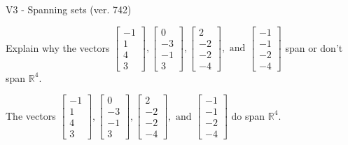 \begin{exercise}
  \begin{exerciseTitle}V3 - Spanning sets (ver. 742)\end{exerciseTitle}
  \begin{exerciseStatement}
    Explain why the vectors \(\left[\begin{array}{r}
-1 \\
1 \\
4 \\
3
\end{array}\right] , \left[\begin{array}{r}
0 \\
-3 \\
-1 \\
3
\end{array}\right] , \left[\begin{array}{r}
2 \\
-2 \\
-2 \\
-4
\end{array}\right] , \text{ and } \left[\begin{array}{r}
-1 \\
-1 \\
-2 \\
-4
\end{array}\right]\) span or don't span \(\mathbb{R}^4\). 
	


  \end{exerciseStatement}
  \begin{exerciseAnswer}
   The vectors \(\left[\begin{array}{r}
-1 \\
1 \\
4 \\
3
\end{array}\right] , \left[\begin{array}{r}
0 \\
-3 \\
-1 \\
3
\end{array}\right] , \left[\begin{array}{r}
2 \\
-2 \\
-2 \\
-4
\end{array}\right] , \text{ and } \left[\begin{array}{r}
-1 \\
-1 \\
-2 \\
-4
\end{array}\right]\) 
  	 do  
	span \(\mathbb{R}^4\).
  


  \end{exerciseAnswer}
\end{exercise}